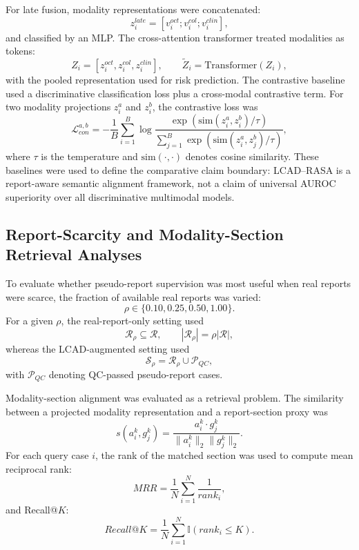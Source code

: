 For late fusion, modality representations were concatenated:
\begin{equation}
z_i^{late}=[v_i^{oct};v_i^{col};v_i^{clin}],
\end{equation}
and classified by an MLP. The cross-attention transformer treated modalities as tokens:
\begin{equation}
Z_i=[z_i^{oct},z_i^{col},z_i^{clin}],
\qquad
\tilde{Z}_i=\mathrm{Transformer}(Z_i),
\end{equation}
with the pooled representation used for risk prediction. The contrastive baseline used a discriminative classification loss plus a cross-modal contrastive term. For two modality projections \(z_i^{a}\) and \(z_i^{b}\), the contrastive loss was
\begin{equation}
\mathcal{L}_{con}^{a,b}
=
-\frac{1}{B}\sum_{i=1}^{B}
\log
\frac{\exp(\mathrm{sim}(z_i^{a},z_i^{b})/\tau)}
{\sum_{j=1}^{B}\exp(\mathrm{sim}(z_i^{a},z_j^{b})/\tau)},
\end{equation}
where \(\tau\) is the temperature and \(\mathrm{sim}(\cdot,\cdot)\) denotes cosine similarity. These baselines were used to define the comparative claim boundary: LCAD--RASA is a report-aware semantic alignment framework, not a claim of universal AUROC superiority over all discriminative multimodal models.

\subsection{Report-Scarcity and Modality-Section Retrieval Analyses}
\label{subsec:methods_scarcity_retrieval}

To evaluate whether pseudo-report supervision was most useful when real reports were scarce, the fraction of available real reports was varied:
\begin{equation}
\rho\in\{0.10,0.25,0.50,1.00\}.
\end{equation}
For a given \(\rho\), the real-report-only setting used
\begin{equation}
\mathcal{R}_{\rho}\subseteq\mathcal{R},
\qquad
|\mathcal{R}_{\rho}|=\rho|\mathcal{R}|,
\end{equation}
whereas the LCAD-augmented setting used
\begin{equation}
\mathcal{S}_{\rho}=\mathcal{R}_{\rho}\cup\mathcal{P}_{QC},
\end{equation}
with \(\mathcal{P}_{QC}\) denoting QC-passed pseudo-report cases.

Modality-section alignment was evaluated as a retrieval problem. The similarity between a projected modality representation and a report-section proxy was
\begin{equation}
s(a_i^k,g_j^k)
=
\frac{a_i^k\cdot g_j^k}{\|a_i^k\|_2\|g_j^k\|_2}.
\end{equation}
For each query case \(i\), the rank of the matched section was used to compute mean reciprocal rank:
\begin{equation}
MRR=
\frac{1}{N}
\sum_{i=1}^{N}
\frac{1}{rank_i},
\end{equation}
and Recall@\(K\):
\begin{equation}
Recall@K=
\frac{1}{N}
\sum_{i=1}^{N}
\mathbb{I}(rank_i\leq K).
\end{equation}

